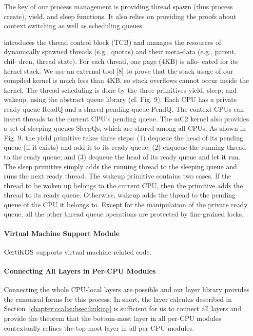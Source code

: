 The key of our process management is providing 
thread spawn (thus process create), yield, and sleep functions.
It also relies on providing the proofs about 
context switching as well as scheduling queues.


introduces the thread control block (TCB) and manages the resources of dynamically spawned threads (e.g., quotas) and their meta-data (e.g., parent, chil-
dren, thread state). For each thread, one page (4KB) is allo- cated for its kernel stack. We use an external tool [8] to prove that the stack usage of our compiled kernel is much less than 4KB, so stack overflows cannot occur inside the kernel.
The thread scheduling is done by the three primitives yield, sleep, and wakeup, using the abstract queue library (cf. Fig. 9). Each CPU has a private ready queue ReadQ and a shared pending queue PendQ. The context CPUs can insert threads to the current CPU’s pending queue. The mC2 kernel also provides a set of sleeping queues SleepQs, which are shared among all CPUs.
As shown in Fig. 9, the yield primitive takes three steps: (1) dequeue the head of its pending queue (if it exists) and add it to its ready queue; (2) enqueue the running thread to the ready queue; and (3) dequeue the head of its ready queue and let it run. The sleep primitive simply adds the running thread to the sleeping queue and runs the next ready thread. The wakeup primitive contains two cases. If the thread to be woken up belongs to the current CPU, then the primitive adds the thread to its ready queue. Otherwise, wakeup adds the thread to the pending queue of the CPU it belongs to. Except for the manipulation of the private ready queue, all the other thread queue operations are protected by fine-grained locks.


\paragraph{Virtual Machine Support Module}

$\mathrm{CertiKOS}$ supports virtual machine related code. 

\paragraph{Connecting All Layers in Per-CPU Modules}

Connecting the whole CPU-local layers are possible and 
our layer library provides the canonical forms for this process. 
In short, the layer calculus described in Section~\ref{chapter:ccal:subsec:linking} is sufficient for us to 
connect all layers and provide the theorem that 
the bottom-most layer in all per-CPU modules contextually refines the top-most layer in all per-CPU modules.

